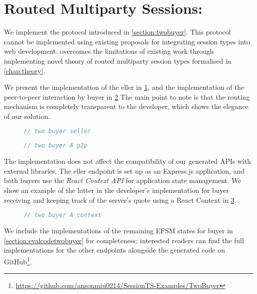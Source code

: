 \section{Routed Multiparty Sessions: }
\label{section:evaltwobuyer}

We implement the  protocol
introduced in \cref{section:twobuyer}. 
This protocol cannot be implemented using
existing proposals \cite{PureScript2019,MVU2020} for integrating
session types into web development.
\codegen overcomes the limitations of existing work
through implementing novel theory of routed multiparty
session types formalised in \cref{chap:theory}.

We present the implementation of the eller
in \cref{lst:evaltwobuyerseller}, 
and the implementation
of the peer-to-peer interaction by buyer 
in \cref{lst:evaltwobuyerA}
The main point to note is that the routing mechanism
is completely transparent to the developer,
which shows the elegance of our solution.

\begin{figure}[!h]
\begin{lstlisting}[language=javascript]
// two buyer seller
\end{lstlisting}
\label{lst:evaltwobuyerseller}
\end{figure}

\begin{figure}[!h]
\begin{lstlisting}[language=javascript]
// two buyer A p2p
\end{lstlisting}
\label{lst:evaltwobuyerA}
\end{figure}

The \newtheory implementation does not affect
the compatibility of our generated APIs with external libraries.
The eller endpoint is set up as an Express.js
application, and both buyers use the \textit{React Context API}
for application state management. We show an example of
the latter in the developer's implementation for
buyer  receiving and keeping track of the server's quote
using a React Context in \cref{lst:evaltwobuyercontext}.

\begin{figure}[!h]
\begin{lstlisting}[language=javascript]
// two buyer A context
\end{lstlisting}
\label{lst:evaltwobuyercontext}
\end{figure}

We include the implementations of the remaining EFSM states
for buyer  in \cref{section:evalcodetwobuyer}
for completeness;
interested readers can find the full implementations for the other
endpoints alongside the generated code on
GitHub\footnote{
\url{https://github.com/ansonmiu0214/SessionTS-Examples/TwoBuyer}
}.
